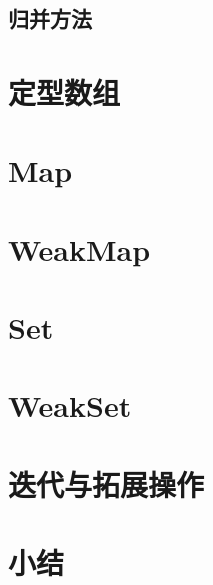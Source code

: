 \subsection{归并方法}

\section{定型数组}
\section{Map}
\section{WeakMap}
\section{Set}
\section{WeakSet}
\section{迭代与拓展操作}
\section{小结}